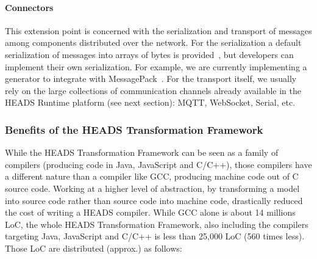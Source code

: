 \paragraph{Connectors}

This extension point is concerned with the serialization and transport of messages among components distributed over the network. For the serialization a default serialization of messages into arrays of bytes is provided~\cite{DBLP:conf/models/FleureyMSB11}, but developers can implement their own serialization. For example, we are currently implementing a generator to integrate with MessagePack~\cite{furuhashimessagepack}. For the transport itself, we usually rely on the large collections of communication channels already available in the HEADS Runtime platform (see next section): MQTT, WebSocket, Serial, etc. 

\subsubsection{Benefits of the HEADS Transformation Framework}
While the HEADS Transformation Framework can be seen as a family of compilers (producing code in Java, JavaScript and C/C++), those compilers have a different nature than a compiler like GCC, producing machine code out of C source code. Working at a higher level of abstraction, by transforming a model into source code rather than source code into machine code, drastically reduced the cost of writing a HEADS compiler. While GCC alone is about 14 millions LoC, the whole HEADS Transformation Framework, also including the compilers targeting Java, JavaScript and C/C++ is less than 25,000 LoC (560 times less). Those LoC are distributed (approx.) as follows:

